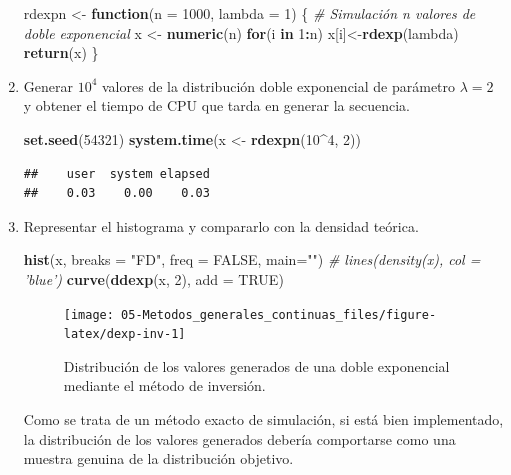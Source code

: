 \documentclass[
]{book}
\newenvironment{Shaded}{\begin{snugshade}}{\end{snugshade}}
\newcommand{\CommentTok}[1]{\textcolor[rgb]{0.56,0.35,0.01}{\textit{#1}}}
\newcommand{\ControlFlowTok}[1]{\textcolor[rgb]{0.13,0.29,0.53}{\textbf{#1}}}
\newcommand{\DataTypeTok}[1]{\textcolor[rgb]{0.13,0.29,0.53}{#1}}
\newcommand{\DecValTok}[1]{\textcolor[rgb]{0.00,0.00,0.81}{#1}}
\newcommand{\KeywordTok}[1]{\textcolor[rgb]{0.13,0.29,0.53}{\textbf{#1}}}
\newcommand{\NormalTok}[1]{#1}
\newcommand{\OperatorTok}[1]{\textcolor[rgb]{0.81,0.36,0.00}{\textbf{#1}}}
\newcommand{\OtherTok}[1]{\textcolor[rgb]{0.56,0.35,0.01}{#1}}
\newcommand{\StringTok}[1]{\textcolor[rgb]{0.31,0.60,0.02}{#1}}
\theoremstyle{break}
\theoremstyle{definition}
\theoremstyle{definition}
\theoremstyle{definition}
\theoremstyle{remark}
\begin{document}
\begin{enumerate}
\begin{Shaded}
\begin{Highlighting}[]
\NormalTok{rdexpn <-}\StringTok{ }\ControlFlowTok{function}\NormalTok{(}\DataTypeTok{n =} \DecValTok{1000}\NormalTok{, }\DataTypeTok{lambda =} \DecValTok{1}\NormalTok{) \{}
\CommentTok{# Simulación n valores de doble exponencial}
\NormalTok{    x <-}\StringTok{ }\KeywordTok{numeric}\NormalTok{(n)}
    \ControlFlowTok{for}\NormalTok{(i }\ControlFlowTok{in} \DecValTok{1}\OperatorTok{:}\NormalTok{n) x[i]<-}\KeywordTok{rdexp}\NormalTok{(lambda)}
    \KeywordTok{return}\NormalTok{(x)}
\NormalTok{\}}
\end{Highlighting}
\end{Shaded}
\item
  Generar \(10^{4}\) valores de la distribución doble exponencial de
  parámetro \(\lambda=2\) y obtener el tiempo de CPU que tarda en
  generar la secuencia.

\begin{Shaded}
\begin{Highlighting}[]
\KeywordTok{set.seed}\NormalTok{(}\DecValTok{54321}\NormalTok{)}
\KeywordTok{system.time}\NormalTok{(x <-}\StringTok{ }\KeywordTok{rdexpn}\NormalTok{(}\DecValTok{10}\OperatorTok{^}\DecValTok{4}\NormalTok{, }\DecValTok{2}\NormalTok{))}
\end{Highlighting}
\end{Shaded}

\begin{verbatim}
##    user  system elapsed 
##    0.03    0.00    0.03
\end{verbatim}
\item
  Representar el histograma y compararlo con la densidad teórica.

\begin{Shaded}
\begin{Highlighting}[]
\KeywordTok{hist}\NormalTok{(x, }\DataTypeTok{breaks =} \StringTok{"FD"}\NormalTok{, }\DataTypeTok{freq =} \OtherTok{FALSE}\NormalTok{, }\DataTypeTok{main=}\StringTok{""}\NormalTok{)}
\CommentTok{# lines(density(x), col = 'blue')}
\KeywordTok{curve}\NormalTok{(}\KeywordTok{ddexp}\NormalTok{(x, }\DecValTok{2}\NormalTok{), }\DataTypeTok{add =} \OtherTok{TRUE}\NormalTok{)}
\end{Highlighting}
\end{Shaded}

  \begin{figure}[!htb]

  {\centering \texttt{[image: 05-Metodos\_generales\_continuas\_files/figure-latex/dexp-inv-1]} 

  }

  \caption{Distribución de los valores generados de una doble exponencial mediante el método de inversión.}\label{fig:dexp-inv}
  \end{figure}

  Como se trata de un método exacto de simulación, si está bien implementado, la distribución de los valores generados debería comportarse como una muestra genuina de la distribución objetivo.
\end{enumerate}
\end{document}
